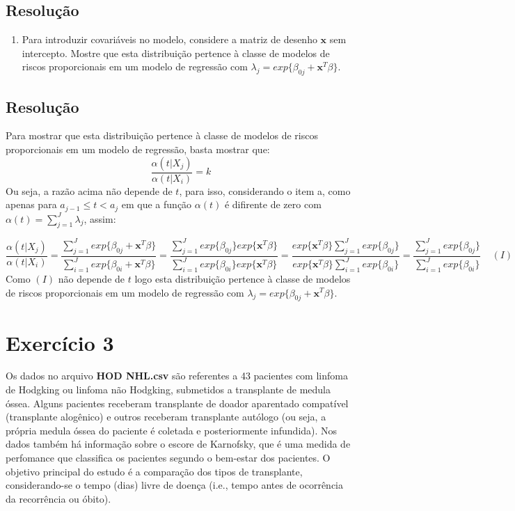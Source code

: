 \documentclass[]{article}
\providecommand{\tightlist}{%
  \setlength{\itemsep}{0pt}\setlength{\parskip}{0pt}}
\begin{document}
\subsection{Resolução}\label{resolucao-3}

\begin{enumerate}
\def\labelenumi{(\alph{enumi})}
\setcounter{enumi}{2}
\tightlist
\item
  Para introduzir covariáveis no modelo, considere a matriz de desenho
  \(\boldsymbol{x}\) sem intercepto. Mostre que esta distribuição
  pertence à classe de modelos de riscos proporcionais em um modelo de
  regressão com \(\lambda_j=exp \{\beta_{0j}+\boldsymbol{x}^T\beta \}\).
\end{enumerate}

\subsection{Resolução}\label{resolucao-4}

Para mostrar que esta distribuição pertence à classe de modelos de
riscos proporcionais em um modelo de regressão, basta mostrar que:
\[\frac{\alpha(t|X_j)}{\alpha(t|X_i)} = k\] Ou seja, a razão acima não
depende de \(t\), para isso, considerando o item a, como apenas para
\(a_{j-1} \leq t < a_j\) em que a função \(\alpha(t)\) é difirente de
zero com \(\alpha(t)=\sum_{j=1}^J \lambda_j\), assim:

\[\frac{\alpha(t|X_j)}{\alpha(t|X_i)} =\frac{\sum_{j=1}^J exp \{\beta_{0j}+\boldsymbol{x}^T\beta \}}{\sum_{i=1}^J exp \{\beta_{0i}+\boldsymbol{x}^T\beta \}}=\frac{\sum_{j=1}^J exp \{\beta_{0j}\} exp\{\boldsymbol{x}^T\beta \}}{\sum_{i=1}^J exp \{\beta_{0i}\} exp\{ \boldsymbol{x}^T\beta \}} =\frac{ exp\{\boldsymbol{x}^T\beta \} \sum_{j=1}^J exp \{\beta_{0j}\}}{ exp\{\boldsymbol{x}^T\beta \}\sum_{i=1}^J exp \{\beta_{0i}\}}=\frac{\sum_{j=1}^J exp \{\beta_{0j}\}}{ \sum_{i=1}^J exp \{\beta_{0i}\}} \ \ \ \ \ (I)\]
Como \((I)\) não depende de \(t\) logo esta distribuição pertence à
classe de modelos de riscos proporcionais em um modelo de regressão com
\(\lambda_j=exp \{\beta_{0j}+\boldsymbol{x}^T\beta \}\).

\section{Exercício 3}\label{exercicio-3}

Os dados no arquivo \textbf{HOD NHL.csv} são referentes a 43 pacientes
com linfoma de Hodgking ou linfoma não Hodgking, submetidos a
transplante de medula óssea. Alguns pacientes receberam transplante de
doador aparentado compatível (transplante alogênico) e outros receberam
transplante autólogo (ou seja, a própria medula óssea do paciente é
coletada e posteriormente infundida). Nos dados também há informação
sobre o escore de Karnofsky, que é uma medida de perfomance que
classifica os pacientes segundo o bem-estar dos pacientes. O objetivo
principal do estudo é a comparação dos tipos de transplante,
considerando-se o tempo (dias) livre de doença (i.e., tempo antes de
ocorrência da recorrência ou óbito).
\end{document}
